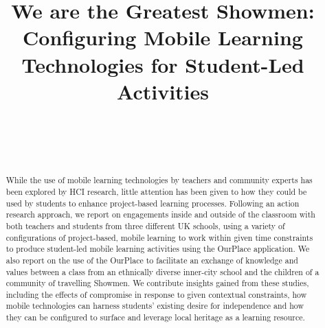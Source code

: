 \documentclass[,hyphens]{sigchi}
\begin{document}
\title{We are the Greatest Showmen: Configuring Mobile Learning Technologies for Student-Led Activities}

\author{%
  \\
  \\
  \\
}

\maketitle

\begin{abstract}
While the use of mobile learning technologies by teachers and community experts has been explored by HCI research, little attention has been given to how they could be used by students to enhance project-based learning processes. Following an action research approach, we report on engagements inside and outside of the classroom with both teachers and students from three different UK schools, using a variety of configurations of project-based, mobile learning to work within given time constraints to produce student-led mobile learning activities using the OurPlace application. We also report on the use of the OurPlace to facilitate an exchange of knowledge and values between a class from an ethnically diverse inner-city school and the children of a community of travelling Showmen. We contribute insights gained from these studies, including the effects of compromise in response to given contextual constraints, how mobile technologies can harness students' existing desire for independence and how they can be configured to surface and leverage local heritage as a learning resource.
\end{abstract}


\end{document}
